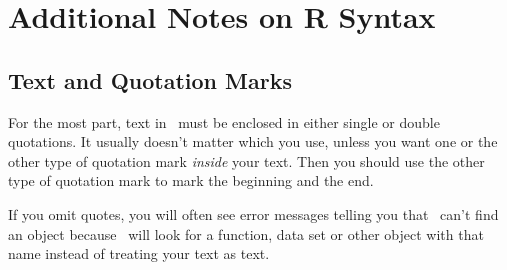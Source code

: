 \vspace{-8mm}
\section{Additional Notes on R Syntax}


\subsection{Text and Quotation Marks}

For the most part, text in \R\ must be enclosed in either single or double quotations.  
It usually doesn't matter which you use, unless you want one or the other type of 
quotation mark \emph{inside} your text.  Then you should use the other type of 
quotation mark to mark the beginning and the end.

\begin{knitrout}
\end{knitrout}


If you omit quotes, you will often see error messages telling you that \R\ can't find 
an object because \R\
will look for a function, data set or other object with that name instead of treating
your text as text.
\begin{knitrout}
\end{knitrout}


